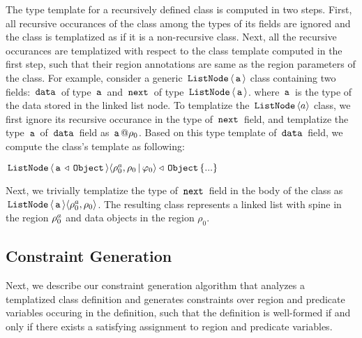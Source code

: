 The type template for a recursively defined class is computed in two
steps. First, all recursive occurances of the class among the types of
its fields are ignored and the class is templatized as if it is a
non-recursive class. Next, all the recursive occurances are
templatized with respect to the class template computed in the first
step, such that their region annotations are same as the region
parameters of the class. For example, consider a generic
$\,{\tt ListNode}\,\langle \,{\tt a}\, \rangle$ class containing two fields: $\,{\tt data}\,$ of
type $\,{\tt a}\,$ and $\,{\tt next}\,$ of type $\,{\tt ListNode}\,\langle \,{\tt a}\, \rangle$.  where
$\,{\tt a}\,$ is the type of the data stored in the linked list node.  To
templatize the $\,{\tt ListNode}\,\langle a \rangle$ class, we first ignore its
recursive occurance in the type of $\,{\tt next}\,$ field, and templatize
the type $\,{\tt a}\,$ of $\,{\tt data}\,$ field as $\,{\tt a}\,@\rho_0$. Based on this
type template of $\,{\tt data}\,$ field, we compute the class's template
as following:
\begin{center}
$\,{\tt ListNode}\,\langle \,{\tt a}\,\triangleleft\,{\tt Object}\, \rangle
\langle \rho^a_0,\rho_0\,|\,\varphi_0 \rangle \triangleleft \,{\tt Object}\, \{...\}$
\end{center}
Next, we trivially templatize the type of $\,{\tt next}\,$ field in the body
of the class as $\,{\tt ListNode}\,\langle \,{\tt a}\, \rangle\langle \rho^a_0,\rho_0 \rangle$.
The resulting class represents a linked list with spine in the region
$\rho^a_0$ and data objects in the region $\rho_0$.





\subsection{Constraint Generation}

Next, we describe our constraint generation algorithm that analyzes a
templatized class definition and generates constraints over region and
predicate variables occuring in the definition, such that the
definition is well-formed if and only if there exists a satisfying
assignment to region and predicate variables. 

